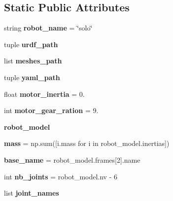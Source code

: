 \subsection*{Static Public Attributes}
\begin{DoxyCompactItemize}
\item 
\mbox{\label{classrobot__properties__solo_1_1config_1_1SoloConfig_a4e8858bf41253f84618b56cb4078a895}} 
string {\bfseries robot\+\_\+name} = \char`\"{}solo\char`\"{}
\item 
tuple {\bfseries urdf\+\_\+path}
\item 
list {\bfseries meshes\+\_\+path}
\item 
tuple {\bfseries yaml\+\_\+path}
\item 
\mbox{\label{classrobot__properties__solo_1_1config_1_1SoloConfig_a12d720f23faf864ef7647c757af1b218}} 
float {\bfseries motor\+\_\+inertia} = 0.
\item 
\mbox{\label{classrobot__properties__solo_1_1config_1_1SoloConfig_a559ced3a5570ce1276577ea5c3ab8602}} 
int {\bfseries motor\+\_\+gear\+\_\+ration} = 9.
\item 
{\bfseries robot\+\_\+model}
\item 
\mbox{\label{classrobot__properties__solo_1_1config_1_1SoloConfig_aa37d5b10d35ab3b579fd62b4e1ad572e}} 
{\bfseries mass} = np.\+sum(\mbox{[}i.\+mass for i in robot\+\_\+model.\+inertias\mbox{]})
\item 
\mbox{\label{classrobot__properties__solo_1_1config_1_1SoloConfig_a0b4136fce9ca843680096545d6dc34a8}} 
{\bfseries base\+\_\+name} = robot\+\_\+model.\+frames\mbox{[}2\mbox{]}.name
\item 
\mbox{\label{classrobot__properties__solo_1_1config_1_1SoloConfig_af689510a467b1a99d82d484fdfee0e36}} 
int {\bfseries nb\+\_\+joints} = robot\+\_\+model.\+nv -\/ 6
\item 
list {\bfseries joint\+\_\+names}
\item 

\end{DoxyCompactItemize}
